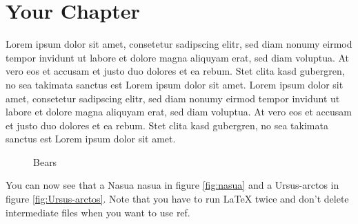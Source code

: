 \documentclass[a4paper]{scrreprt}
\begin{document}
\chapter{Your Chapter}
Lorem ipsum dolor sit amet, consetetur sadipscing elitr, sed diam 
nonumy eirmod tempor invidunt ut labore et dolore magna aliquyam 
erat, sed diam voluptua. At vero eos et accusam et justo duo dolores 
et ea 
rebum. Stet clita kasd gubergren, no sea takimata sanctus est Lorem 
ipsum dolor sit amet. Lorem ipsum dolor sit amet, consetetur 
sadipscing elitr, sed diam nonumy eirmod tempor invidunt ut labore et
dolore magna aliquyam erat, sed diam voluptua. At vero eos et accusam
et justo duo dolores et ea rebum. Stet clita kasd gubergren, no sea 
takimata sanctus est Lorem ipsum dolor sit amet.

\begin{figure}[ht]
    \centering
    \label{fig:formen}
    \caption{Bears}
\end{figure}

You can now see that a Nasua nasua in figure \ref{fig:nasua} and a Ursus-arctos 
in figure \ref{fig:Ursus-arctos}. Note that you have to run LaTeX twice and
don't delete intermediate files when you want to use ref.
\end{document}
